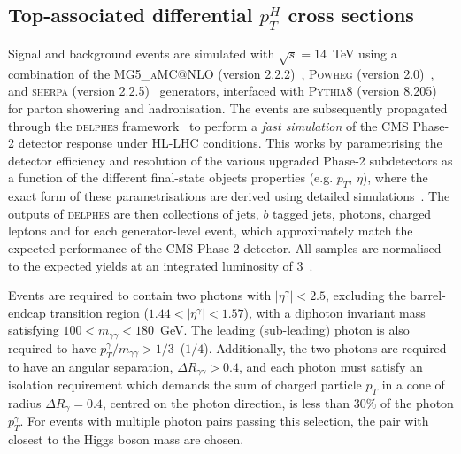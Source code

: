 \subsection{Top-associated differential $p_T^H$ cross sections}
Signal and background events are simulated with $\sqrt{s}=14$~TeV using a combination of the \textsc{MG5\_aMC@NLO} (version 2.2.2)~\cite{Alwall:2014hca}, \textsc{Powheg} (version 2.0)~\cite{Nason:2004rx,Frixione:2007vw,Alioli:2008tz,Nason:2009ai,Alioli:2010xd,Hartanto:2015uka}, and \textsc{sherpa} (version 2.2.5)~\cite{Gleisberg:2008ta} generators, interfaced with \textsc{Pythia8} (version 8.205)~\cite{Sjostrand:2014zea} for parton showering and hadronisation. The events are subsequently propagated through the \textsc{delphes} framework~\cite{deFavereau:2013fsa} to perform a \textit{fast simulation} of the CMS Phase-2 detector response under HL-LHC conditions. This works by parametrising the detector efficiency and resolution of the various upgraded Phase-2 subdetectors as a function of the different final-state objects properties (e.g. $p_T$, $\eta$), where the exact form of these parametrisations are derived using detailed simulations~\cite{Contardo:2020886}. The outputs of \textsc{delphes} are then collections of jets, $b$ tagged jets, photons, charged leptons and \met for each generator-level event, which approximately match the expected performance of the CMS Phase-2 detector. All samples are normalised to the expected yields at an integrated luminosity of 3~\abinv.

Events are required to contain two photons with $|\eta^\gamma|<2.5$, excluding the barrel-endcap transition region ($1.44<|\eta^\gamma|<1.57$), with a diphoton invariant mass satisfying $100<m_{\gamma\gamma}<180$~GeV. The leading (sub-leading) photon is also required to have $p^\gamma_T/m_{\gamma\gamma}>1/3$~($1/4$). Additionally, the two photons are required to have an angular separation, $\Delta R_{\gamma\gamma}>0.4$, and each photon must satisfy an isolation requirement which demands the sum of charged particle $p_T$ in a cone of radius $\Delta R_{\gamma}=0.4$, centred on the photon direction, is less than 30\% of the photon $p_T^\gamma$. For events with multiple photon pairs passing this selection, the pair with \mgg closest to the Higgs boson mass are chosen.

